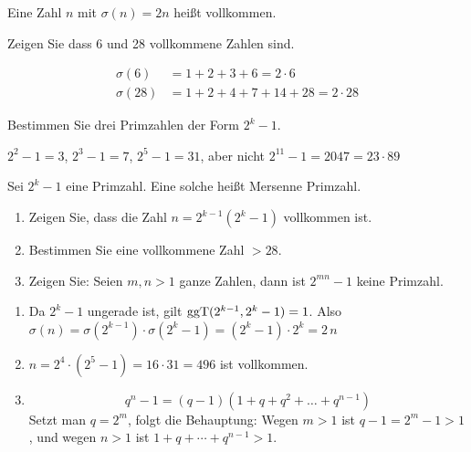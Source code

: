 Eine Zahl $n$ mit $\sigma(n) = 2n$ heißt vollkommen.

\begin{aufgabe}[Aufgabe 4]
Zeigen Sie dass 6 und 28 vollkommene Zahlen sind.
\end{aufgabe}

\begin{loesung}
\begin{align*}
\sigma(6) &= 1 + 2 + 3 + 6 = 2 \cdot 6\\
\sigma(28) &= 1 + 2 + 4 + 7 + 14 + 28 = 2 \cdot 28
\end{align*}
\end{loesung}

\begin{aufgabe}[Aufgabe 5]
Bestimmen Sie drei Primzahlen der Form $2^k - 1$.
\end{aufgabe}

\begin{loesung}
$2^2 - 1 = 3$, \quad $2^3 - 1 = 7$, \quad $2^5 - 1 = 31$, \quad aber nicht $2^{11} - 1 = 2047 = 23 \cdot 89$
\end{loesung}

\begin{aufgabe}[Aufgabe 6]
Sei $2^k - 1$ eine Primzahl. Eine solche heißt Mersenne Primzahl.
\begin{enumerate}[label=\alph*)]
  \item Zeigen Sie, dass die Zahl $n = 2^{k-1}(2^k - 1)$ vollkommen ist.
  \item Bestimmen Sie eine vollkommene Zahl $> 28$.
  \item Zeigen Sie: Seien $m, n > 1$ ganze Zahlen, dann ist $2^{mn} - 1$ keine Primzahl.
\end{enumerate}
\end{aufgabe}

\begin{loesung}
\begin{enumerate}[label=\alph*)]
  \item Da $2^k - 1$ ungerade ist, gilt $\operatorname{ggT}(2^{k-1}, 2^k - 1) = 1$. Also
  $\sigma(n) = \sigma(2^{k-1}) \cdot \sigma(2^k - 1) = (2^k - 1) \cdot 2^k = 2\,n$
  \item $n = 2^4 \cdot (2^5 - 1) = 16 \cdot 31 = 496$ \quad ist vollkommen.
  \item \[ q^n - 1 = (q - 1)(1 + q + q^2 + \ldots + q^{n-1}) \]
  Setzt man $q = 2^m$, folgt die Behauptung: Wegen $m > 1$ ist $q - 1 = 2^m - 1 > 1$, und wegen $n > 1$ ist $1 + q + \cdots + q^{n-1} > 1$.
\end{enumerate}
\end{loesung}

